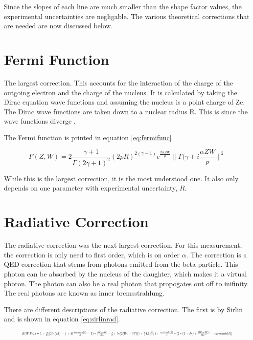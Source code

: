 Since the slopes of each line are much smaller than the shape factor values, the experimental uncertainties are negligable. 
The various theoretical corrections that are needed are now discussed below.

\section{Fermi Function}

The largest correction. 
This accounts for the interaction of the charge of the outgoing electron and the charge of the nucleus.
It is calculated by taking the Dirac equation wave functions and assuming the nucleus is a point charge of Ze.
The Dirac wave functions are taken down to a nuclear radius R.
This is since the wave functions diverge \cite{Wil89}.

The Fermi function is printed in equation \ref{eq:fermifunc}

\begin{equation}
	F(Z,W) = 2\frac{\gamma + 1}{\Gamma(2\gamma +1)^{2}}(2pR)^{2(\gamma - 1)}e^{\frac{\pi\alpha ZW}{p}}\|\Gamma(\gamma + i\frac{\alpha ZW}{p}\|^{2}
	\label{eq:fermifunc}
\end{equation}

While this is the largest correction, it is the most understood one.
It also only depends on one parameter with experimental uncertainty, $R$. 


\section{Radiative Correction}
The radiative correction was the next largest correction.
For this measurement, the correction is only need to first order, which is on order $\alpha$.
The correction is a QED correction that stems from photons emitted from the beta particle.
This photon can be absorbed by the nucleus of the daughter, which makes it a virtual photon.
The photon can also be a real photon that propogates out off to inifinity.
The real photons are known as inner bremsstrahlung.

There are different descriptions of the radiative correction.  
The first is by Sirlin \cite{Sir67} and is shown in equation \ref{eq:sirlinrad}.

\begin{equation}
	\resizebox{.9\textwidth}{!}
	{
	$R(W,W_{0}) = 1 + \frac{\alpha}{2\pi}[3ln(M) - \frac{3}{4} + 4(\frac{arctanh(\beta)}{\beta} - 1)*(\frac{W_{0} - W}{3W} - \frac{3}{2} + ln(2(W_{0} - W))) + \frac{4}{\beta}L(\frac{2\beta}{1 + \beta}) + \frac{arctanh(\beta)}{\beta}*(2*(1 + \beta^{2}) + \frac{(W_{0} - W)^{2}}{6W^{2}} - 4 arctanh(\beta)]$
	}
	\label{eq:sirlinrad}
\end{equation} 

